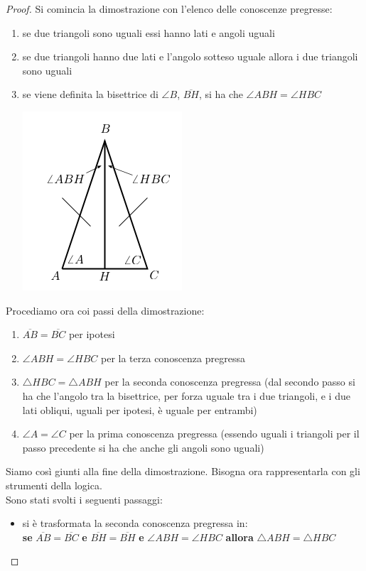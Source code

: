 \documentclass[a4paper,12pt, oneside]{book}
\begin{document}
\begin{proof}
	Si comincia la dimostrazione con l'elenco delle conoscenze pregresse:
	\begin{enumerate}
		\item se due triangoli sono uguali essi hanno lati e angoli uguali
		\item se due triangoli hanno due lati e l'angolo sotteso uguale allora i due triangoli sono uguali
		\item se viene definita la bisettrice di $\angle B$, $\overline{BH}$, si ha che $\angle ABH = \angle HBC$
		      \begin{center}
			      \includegraphics[scale=0.5]{img/tri2.png}
		      \end{center}
	\end{enumerate}
	Procediamo ora coi passi della dimostrazione:
	\begin{enumerate}
		\item $\overline{AB}=\overline{BC}$ per ipotesi
		\item $\angle ABH = \angle HBC$ per la terza conoscenza pregressa
		\item $\triangle HBC = \triangle ABH$ per la seconda conoscenza pregressa (dal secondo passo si ha che l'angolo tra la bisettrice, per forza uguale tra i due triangoli, e i due lati obliqui, uguali per ipotesi, è uguale per entrambi)
		\item $\angle A= \angle C$ per la prima conoscenza pregressa (essendo uguali i triangoli per il passo precedente si ha che anche gli angoli sono uguali)
	\end{enumerate}
	Siamo così giunti alla fine della dimostrazione. Bisogna ora rappresentarla con gli strumenti della logica.\\
	Sono stati svolti i seguenti passaggi:
	\begin{itemize}
		\item si è trasformata la seconda conoscenza pregressa in:\\\textbf{se} $\overline{AB}=\overline{BC}$ \textbf{e} $\overline{BH}=\overline{BH}$ \textbf{e} $\angle ABH = \angle HBC$ \textbf{allora} $\triangle ABH=\triangle HBC$

\end{itemize}
\end{proof}
\end{document}
